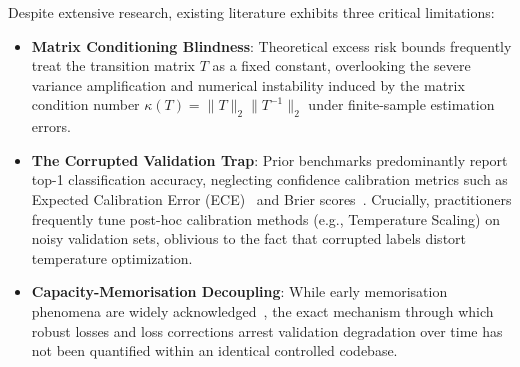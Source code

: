 \documentclass[journal]{IEEEtran}
\theoremstyle{definition}
\begin{document}
Despite extensive research, existing literature exhibits three critical limitations:
\begin{itemize}
    \item \textbf{Matrix Conditioning Blindness}: Theoretical excess risk bounds frequently treat the transition matrix $T$ as a fixed constant, overlooking the severe variance amplification and numerical instability induced by the matrix condition number $\kappa(T) = \|T\|_2 \|T^{-1}\|_2$ under finite-sample estimation errors.
    \item \textbf{The Corrupted Validation Trap}: Prior benchmarks predominantly report top-1 classification accuracy, neglecting confidence calibration metrics such as Expected Calibration Error (ECE)~\cite{guo2017calibration,nixon2019measuring} and Brier scores~\cite{brier1950verification}. Crucially, practitioners frequently tune post-hoc calibration methods (e.g., Temperature Scaling) on noisy validation sets, oblivious to the fact that corrupted labels distort temperature optimization.
    \item \textbf{Capacity-Memorisation Decoupling}: While early memorisation phenomena are widely acknowledged~\cite{arpit2017closer}, the exact mechanism through which robust losses and loss corrections arrest validation degradation over time has not been quantified within an identical controlled codebase.
\end{itemize}
\end{document}
